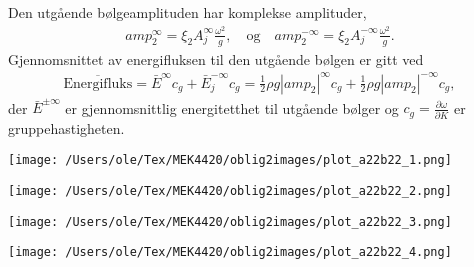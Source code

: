 \documentclass{beamer}
\begin{document}
\begin{frame}
Den utgående bølgeamplituden har komplekse amplituder,
\begin{align}
	amp_2^{\infty} = \xi_2 A_j^{ \infty} \frac{\omega^2}{g}, \quad \text{og} \quad amp_2^{-\infty} = \xi_2 A_j^{- \infty} \frac{\omega^2}{g}.
\end{align}
Gjennomsnittet av energifluksen til den utgående bølgen er gitt ved
\begin{align}
	\overline{\text{Energifluks}} = \bar{E}^{\infty}c_g + \bar{E}_j^{-\infty}c_g =  \frac{1}{2}\rho g {|amp_2|}^{\infty}c_g + \frac{1}{2}\rho g {|amp_2|}^{-\infty}c_g,
\end{align}
der $\bar{E}^{\pm \infty}$ er gjennomsnittlig energitetthet til utgående bølger og $c_g = \frac{\partial \omega}{\partial K}$ er gruppehastigheten. 
\end{frame}


\begin{frame}
\begin{minipage}[t]{0.45\linewidth}
    \texttt{[image: /Users/ole/Tex/MEK4420/oblig2images/plot\_a22b22\_1.png]}
    \label{fig:a22_1}
\end{minipage}
\hspace{0.05\linewidth}
\begin{minipage}[t]{0.45\linewidth}
    \texttt{[image: /Users/ole/Tex/MEK4420/oblig2images/plot\_a22b22\_2.png]}
    \label{fig:a22_2}
\end{minipage}
\begin{minipage}[t]{0.45\linewidth}
    \texttt{[image: /Users/ole/Tex/MEK4420/oblig2images/plot\_a22b22\_3.png]}
    \label{fig:a22_3}
\end{minipage}
\hspace{0.05\linewidth}
\begin{minipage}[t]{0.45\linewidth}
    \texttt{[image: /Users/ole/Tex/MEK4420/oblig2images/plot\_a22b22\_4.png]}
    \label{fig:a22_4}
\end{minipage} 
\end{frame}
\end{document}
